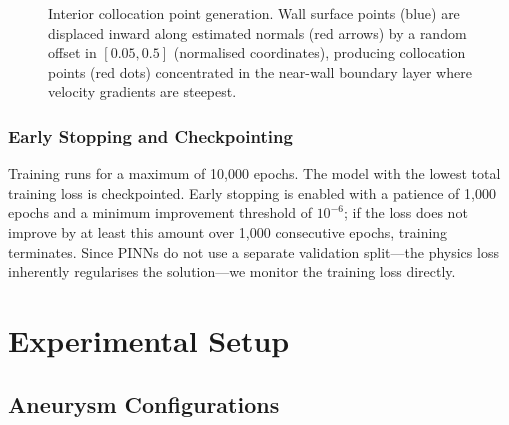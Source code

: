\documentclass[11pt,a4paper]{article}
\begin{document}
\begin{figure}[t]
\caption{Interior collocation point generation. Wall surface points (blue) are displaced inward along estimated normals (red arrows) by a random offset in $[0.05, 0.5]$ (normalised coordinates), producing collocation points (red dots) concentrated in the near-wall boundary layer where velocity gradients are steepest.}
\label{fig:collocation}
\end{figure}

\subsubsection{Early Stopping and Checkpointing}

Training runs for a maximum of 10{,}000 epochs. The model with the lowest total training loss is checkpointed. Early stopping is enabled with a patience of 1{,}000 epochs and a minimum improvement threshold of $10^{-6}$; if the loss does not improve by at least this amount over 1{,}000 consecutive epochs, training terminates. Since PINNs do not use a separate validation split---the physics loss inherently regularises the solution---we monitor the training loss directly.

\section{Experimental Setup}

\subsection{Aneurysm Configurations}
\end{document}
